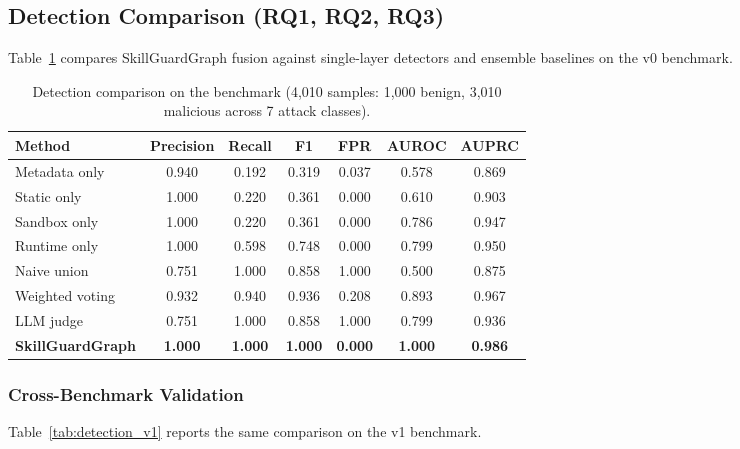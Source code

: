\documentclass[10pt]{article}
\begin{document}
\subsection{Detection Comparison (RQ1, RQ2, RQ3)}

Table~\ref{tab:detection} compares SkillGuardGraph fusion against single-layer detectors and ensemble baselines on the v0 benchmark.

\begin{table}[t]
\centering
\caption{Detection comparison on the benchmark (4{,}010 samples: 1{,}000 benign, 3{,}010 malicious across 7 attack classes).}
\label{tab:detection}
\begin{tabular}{lcccccc}
\toprule
Method & Precision & Recall & F1 & FPR & AUROC & AUPRC \\
\midrule
Metadata only   & 0.940 & 0.192 & 0.319 & 0.037 & 0.578 & 0.869 \\
Static only     & 1.000 & 0.220 & 0.361 & 0.000 & 0.610 & 0.903 \\
Sandbox only    & 1.000 & 0.220 & 0.361 & 0.000 & 0.786 & 0.947 \\
Runtime only    & 1.000 & 0.598 & 0.748 & 0.000 & 0.799 & 0.950 \\
\midrule
Naive union     & 0.751 & 1.000 & 0.858 & 1.000 & 0.500 & 0.875 \\
Weighted voting & 0.932 & 0.940 & 0.936 & 0.208 & 0.893 & 0.967 \\
LLM judge       & 0.751 & 1.000 & 0.858 & 1.000 & 0.799 & 0.936 \\
\midrule
\textbf{SkillGuardGraph} & \textbf{1.000} & \textbf{1.000} & \textbf{1.000} & \textbf{0.000} & \textbf{1.000} & \textbf{0.986} \\
\bottomrule
\end{tabular}
\end{table}

\subsubsection{Cross-Benchmark Validation}

Table~\ref{tab:detection_v1} reports the same comparison on the v1 benchmark.
\end{document}

